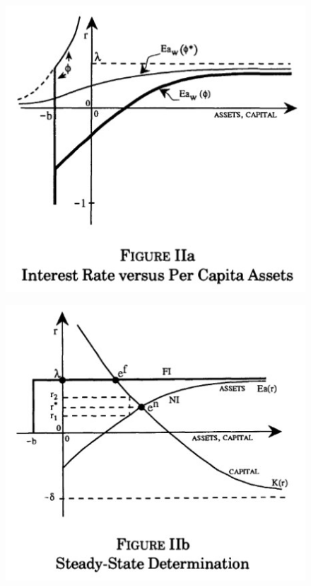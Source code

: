 \documentclass[12pt]{article}
\theoremstyle{definition}
\begin{document}
\begin{figure}
	\centering
	\begin{minipage}{.5\linewidth}
		\caption{}
		\includegraphics{figIIa.jpg}
		\label{figIIa}
		
	\end{minipage}
	\begin{minipage}{.45\linewidth}
		\caption{}
		\includegraphics{figIIb.jpg}
		\label{figIIb}
		
	\end{minipage}
\end{figure}
\end{document}
